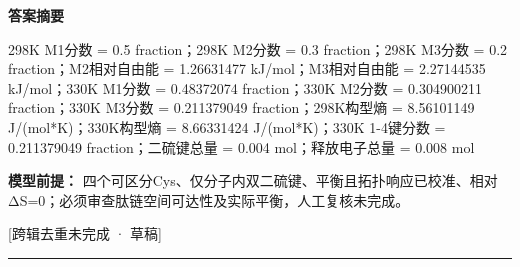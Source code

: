 \documentclass[UTF8,11pt,a4paper]{ctexart}
\begin{document}
\noindent\textbf{答案摘要}\par
298K M1分数 = 0.5 fraction；298K M2分数 = 0.3 fraction；298K M3分数 = 0.2 fraction；M2相对自由能 = 1.26631477 kJ/mol；M3相对自由能 = 2.27144535 kJ/mol；330K M1分数 = 0.48372074 fraction；330K M2分数 = 0.304900211 fraction；330K M3分数 = 0.211379049 fraction；298K构型熵 = 8.56101149 J/(mol*K)；330K构型熵 = 8.66331424 J/(mol*K)；330K 1-4键分数 = 0.211379049 fraction；二硫键总量 = 0.004 mol；释放电子总量 = 0.008 mol\par
\noindent\textbf{模型前提：}
四个可区分Cys、仅分子内双二硫键、平衡且拓扑响应已校准、相对ΔS=0；必须审查肽链空间可达性及实际平衡，人工复核未完成。\par
\noindent\textcolor{red!65!black}{[跨辑去重未完成 · 草稿]} \par
\medskip\hrule\medskip
{}
\end{document}
